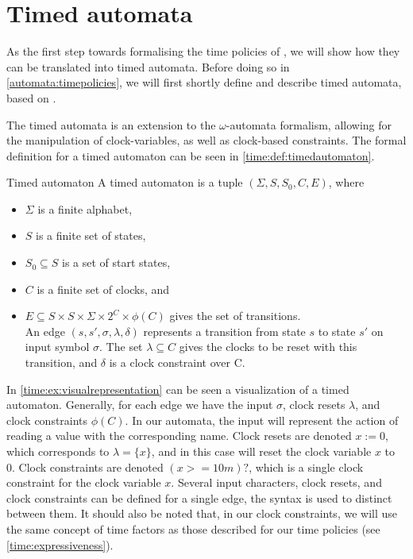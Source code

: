 
\section{Timed automata}\label{automata}
As the first step towards formalising the time policies of \thelang, we will show how they can be translated into timed automata.
Before doing so in \cref{automata:timepolicies}, we will first shortly define and describe timed automata, based on \cite{alur1994theory}.

The timed automata is an extension to the $\omega$-automata formalism, allowing for the manipulation of clock-variables, as well as clock-based constraints.
The formal definition for a timed automaton can be seen in \cref{time:def:timedautomaton}.

\begin{definition}{Timed automaton}\label{time:def:timedautomaton}
A timed automaton is a tuple $(\Sigma, S, S_0, C, E)$, where
\begin{itemize}
  \item $\Sigma$ is a finite alphabet,
  \item $S$ is a finite set of states,
  \item $S_0 \subseteq S$ is a set of start states,
  \item $C$ is a finite set of clocks, and
  \item $E \subseteq S \times S \times \Sigma \times 2^C \times \phi(C)$ gives the set of transitions. \\
    An edge $(s, s', \sigma, \lambda, \delta)$ represents a transition from state $s$ to state $s'$ on input symbol $\sigma$.
    The set $\lambda \subseteq C$ gives the clocks to be reset with this transition, and $\delta$ is a clock constraint over C.
\end{itemize}
\end{definition}

In \cref{time:ex:visualrepresentation} can be seen a visualization of a timed automaton.
Generally, for each edge we have the input $\sigma$, clock resets $\lambda$, and clock constraints $\phi(C)$.
In our automata, the input will represent the action of reading a value with the corresponding name.
Clock resets are denoted $x := 0$, which corresponds to $\lambda = \{ x \}$, and in this case will reset the clock variable $x$ to 0.
Clock constraints are denoted $(x >= 10m)?$, which is a single clock constraint for the clock variable $x$.
Several input characters, clock resets, and clock constraints can be defined for a single edge, the syntax is used to distinct between them.
It should also be noted that, in our clock constraints, we will use the same concept of time factors as those described for our time policies (see \cref{time:expressiveness}).

